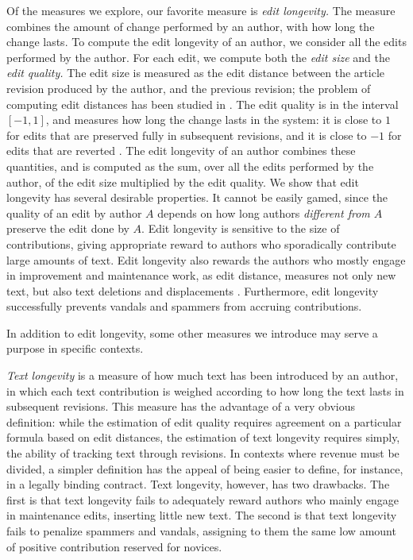 Of the measures we explore, our favorite measure is {\em edit longevity.\/}
The measure combines the amount of change performed by an author, with
how long the change lasts. 
To compute the edit longevity of an author, we consider all the edits
performed by the author. 
For each edit, we compute both the {\em edit size\/} and the 
{\em edit quality.}
The edit size is measured as the edit distance between the article
revision produced by the author, and the previous revision; the
problem of computing edit distances has been studied in 
\cite{EditDist74,TichyEditDist,EditDistanceMoves}. 
The edit quality is in the interval $[-1, 1]$, and measures how long
the change lasts in the system: it is close to $1$ for edits that are
preserved fully in subsequent revisions, and it is close to $-1$ for
edits that are reverted \cite{Adler2007}. 
The edit longevity of an author combines these quantities, and is
computed as the sum, over all the edits performed by the author, of
the edit size multiplied by the edit quality. 
We show that edit longevity has several desirable properties. 
It cannot be easily gamed, since the quality of an edit by author $A$
depends on how long authors {\em different from $A$\/} preserve the
edit done by $A$. 
Edit longevity is sensitive to the size of contributions, giving
appropriate reward to authors who sporadically contribute large
amounts of text. 
Edit longevity also rewards the authors who mostly engage in
improvement and maintenance work, as edit distance, measures not only
new text, but also text deletions and displacements \cite{Adler2007}. 
Furthermore, edit longevity successfully prevents vandals and spammers
from accruing contributions. 

In addition to edit longevity, some other measures we introduce may
serve a purpose in specific contexts. 

{\em Text longevity\/} is a measure of how much text has been
introduced by an author, in which each text contribution is weighed
according to how long the text lasts in subsequent revisions. 
This measure has the advantage of a very obvious definition: while the
estimation of edit quality requires agreement on a particular formula
based on edit distances, the estimation of text longevity requires 
simply, the ability of tracking text through revisions. 
In contexts where revenue must be divided, a simpler definition has
the appeal of being easier to define, for instance, in a legally
binding contract. 
Text longevity, however, has two drawbacks. 
The first is that text longevity fails to adequately reward authors
who mainly engage in maintenance edits, inserting little new text. 
The second is that text longevity fails to penalize spammers and
vandals, assigning to them the same low amount of positive
contribution reserved for novices. 

